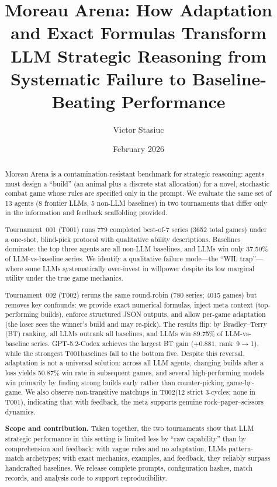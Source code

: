 \documentclass[11pt]{article}
\title{Moreau Arena: How Adaptation and Exact Formulas Transform LLM Strategic Reasoning from Systematic Failure to Baseline-Beating Performance}
\author[1]{Victor Stasiuc}
\affil[1]{Independent Researcher\\
\texttt{stvitek@gmail.com}\\
ORCID: \href{https://orcid.org/0009-0003-2064-0486}{0009-0003-2064-0486}}
\date{February 2026}
\newcommand{\tOne}{T001}
\newcommand{\tTwo}{T002}
\begin{document}
\maketitle

\vspace{-0.7em}
\begin{abstract}
Moreau Arena is a contamination-resistant benchmark for strategic reasoning: agents must design a ``build'' (an animal plus a discrete stat allocation) for a novel, stochastic combat game whose rules are specified only in the prompt.
We evaluate the same set of 13 agents (8 frontier LLMs, 5 non-LLM baselines) in two tournaments that differ only in the information and feedback scaffolding provided.

Tournament~001 (\tOne) runs 779 completed best-of-7 series (3652 total games) under a one-shot, blind-pick protocol with qualitative ability descriptions.
Baselines dominate: the top three agents are all non-LLM baselines, and LLMs win only 37.50\% of LLM-vs-baseline series.
We identify a qualitative failure mode---the ``WIL trap''---where some LLMs systematically over-invest in willpower despite its low marginal utility under the true game mechanics.

Tournament~002 (\tTwo) reruns the same round-robin (780 series; 4015 games) but removes key confounds: we provide exact numerical formulas, inject meta context (top-performing builds), enforce structured JSON outputs, and allow per-game adaptation (the loser sees the winner's build and may re-pick).
The results flip: by Bradley--Terry (BT) ranking, all LLMs outrank all baselines, and LLMs win 89.75\% of LLM-vs-baseline series.
GPT-5.2-Codex achieves the largest BT gain ($+0.881$, rank~9$\to$1), while the strongest \tOne baselines fall to the bottom five.
Despite this reversal, adaptation is not a universal solution: across all LLM agents, changing builds after a loss yields 50.87\% win rate in subsequent games, and several high-performing models win primarily by finding strong builds early rather than counter-picking game-by-game.
We also observe non-transitive matchups in \tTwo (12 strict 3-cycles; none in \tOne), indicating that with feedback, the meta supports genuine rock--paper--scissors dynamics.

\textbf{Scope and contribution.}
Taken together, the two tournaments show that LLM strategic performance in this setting is limited less by ``raw capability'' than by comprehension and feedback: with vague rules and no adaptation, LLMs pattern-match archetypes; with exact mechanics, examples, and feedback, they reliably surpass handcrafted baselines.
We release complete prompts, configuration hashes, match records, and analysis code to support reproducibility.
\end{abstract}
\end{document}
